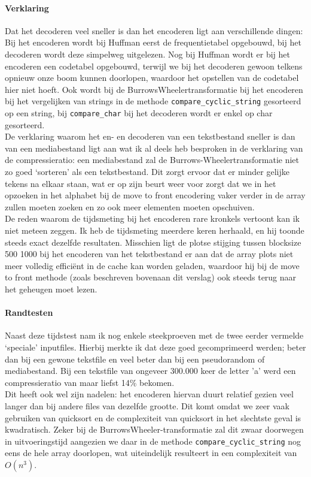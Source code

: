 \documentclass[11pt,a4paper]{article}
\begin{document}
\paragraph*{Verklaring} Dat het decoderen veel sneller is dan het encoderen ligt aan verschillende dingen: Bij het encoderen wordt bij Huffman eerst de frequentietabel opgebouwd, bij het decoderen wordt deze simpelweg uitgelezen. Nog bij Huffman wordt er bij het encoderen een codetabel opgebouwd, terwijl we bij het decoderen gewoon telkens opnieuw onze boom kunnen doorlopen, waardoor het opstellen van de codetabel hier niet hoeft. Ook wordt bij de Burrows\-Wheelertransformatie bij het encoderen bij het vergelijken van strings in de methode \texttt{compare\_cyclic\_string} gesorteerd op een string, bij \texttt{compare\_char} bij het decoderen wordt er enkel op char gesorteerd.\\

De verklaring waarom het en- en decoderen van een tekstbestand sneller is dan van een mediabestand ligt aan wat ik al deels heb besproken in de verklaring van de compressieratio: een mediabestand zal de Burrows-Wheelertransformatie niet zo goed `sorteren' als een tekstbestand. Dit zorgt ervoor dat er minder gelijke tekens na elkaar staan, wat er op zijn beurt weer voor zorgt dat we in het opzoeken in het alphabet bij de move to front encodering vaker verder in de array zullen moeten zoeken en zo ook meer elementen moeten opschuiven.\\

De reden waarom de tijdsmeting bij het encoderen rare kronkels vertoont kan ik niet meteen zeggen. Ik heb de tijdsmeting meerdere keren herhaald, en hij toonde steeds exact dezelfde resultaten. Misschien ligt de plotse stijging tussen blocksize 500 1000 bij het encoderen van het tekstbestand er aan dat de array plots niet meer volledig effici\"ent in de cache kan worden geladen, waardoor hij bij de move to front methode (zoals beschreven bovenaan dit verslag) ook steeds terug naar het geheugen moet lezen.

\paragraph*{Randtesten}
Naast deze tijdstest nam ik nog enkele steekproeven met de twee eerder vermelde `speciale' inputfiles. Hierbij merkte ik dat deze goed gecomprimeerd werden; beter dan bij een gewone tekstfile en veel beter dan bij een pseudorandom of mediabestand. Bij een tekstfile van ongeveer 300.000 keer de letter 'a' werd een compressieratio van maar liefst 14\% bekomen.\\
Dit heeft ook wel zijn nadelen: het encoderen hiervan duurt relatief gezien veel langer dan bij andere files van dezelfde grootte. Dit komt omdat we zeer vaak gebruiken van quicksort en de complexiteit van quicksort in het slechtste geval is kwadratisch. Zeker bij de BurrowsWheeler-transformatie zal dit zwaar doorwegen in uitvoeringstijd aangezien we daar in de methode \texttt{compare\_cyclic\_string} nog eens de hele array doorlopen, wat uiteindelijk resulteert in een complexiteit van $O(n^3)$.
\end{document}
